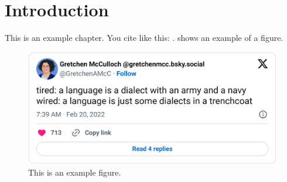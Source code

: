 \chapter{Introduction}
\label{ch:intro}

This is an example chapter. You cite like this: \cite{burchell-etal-2023-open}.  shows an example of a figure.

\begin{figure}[htbp]
    \centering
    \includegraphics[width=0.9\linewidth]{figures/tiredwired.png}
    \caption{This is an example figure.}
    \label{fig:tiredwired}
\end{figure}